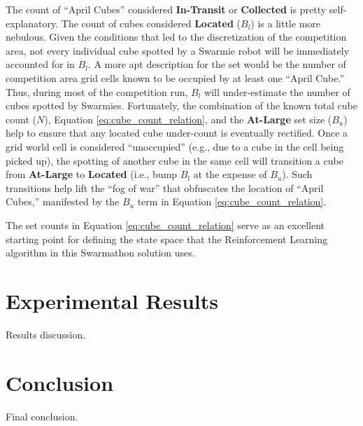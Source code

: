 \documentclass[sigconf,authordraft]{acmart}
\begin{document}
The count of ``April Cubes'' considered \textbf{In-Transit} or \textbf{Collected} is pretty self-explanatory. The count of cubes considered \textbf{Located} ($B_l$) is a little more nebulous. Given the conditions that led to the discretization of the competition area, not every individual cube spotted by a Swarmie robot will be immediately accounted for in $B_l$. A more apt description for the set would be the number of competition area grid cells known to be occupied by at least one ``April Cube.'' Thus, during most of the competition run, $B_l$ will under-estimate the number of cubes spotted by Swarmies. Fortunately, the combination of the known total cube count ($N$), Equation \ref{eq:cube_count_relation}, and the \textbf{At-Large} set size ($B_u$) help to ensure that any located cube under-count is eventually rectified. Once a grid world cell is considered ``unoccupied'' (e.g., due to a cube in the cell being picked up), the spotting of another cube in the same cell will transition a cube from \textbf{At-Large} to \textbf{Located} (i.e., bump $B_l$ at the expense of $B_u$). Such transitions help lift the ``fog of war'' that obfuscates the location of ``April Cubes,'' manifested by the $B_u$ term in Equation \ref{eq:cube_count_relation}.

The set counts in Equation \ref{eq:cube_count_relation} serve as an excellent starting point for defining the state space that the Reinforcement Learning algorithm in this Swarmathon solution uses.

\section{Experimental Results}\label{sec:results}
Results discussion.

\section{Conclusion}\label{sec:conclusion}
Final conclusion.



\end{document}
